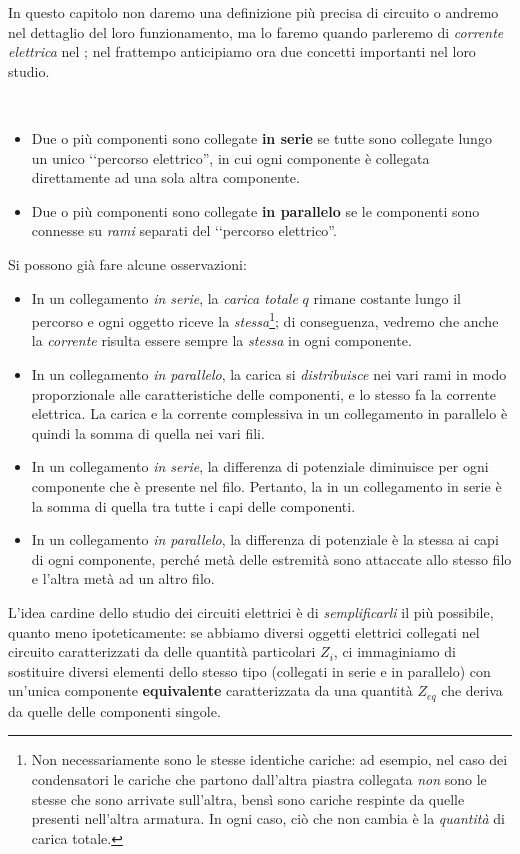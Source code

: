In questo capitolo non daremo una definizione più precisa di circuito o andremo nel dettaglio del loro funzionamento, ma lo faremo quando parleremo di \textit{corrente elettrica} nel ; nel frattempo anticipiamo ora due concetti importanti nel loro studio.
\begin{defines}~
	\begin{itemize}
		\item Due o più componenti sono collegate \textbf{in serie} se tutte sono collegate lungo un unico ‘‘percorso elettrico'', in cui ogni componente è collegata direttamente ad una sola altra componente.
		\item Due o più componenti sono collegate \textbf{in parallelo} se le componenti sono connesse su \textit{rami} separati del ‘‘percorso elettrico''.
	\end{itemize}
\end{defines}
Si possono già fare alcune osservazioni:
\begin{itemize}
	\item In un collegamento \textit{in serie}, la \textit{carica totale} $q$ rimane costante lungo il percorso e ogni oggetto riceve la \textit{stessa}\footnote{Non necessariamente sono le stesse identiche cariche: ad esempio, nel caso dei condensatori le cariche che partono dall'altra piastra collegata \textit{non} sono le stesse che sono arrivate sull'altra, bensì sono cariche respinte da quelle presenti nell'altra armatura. In ogni caso, ciò che non cambia è la \textit{quantità} di carica totale.}; di conseguenza, vedremo che anche la \textit{corrente} risulta essere sempre la \textit{stessa} in ogni componente.
	\item In un collegamento \textit{in parallelo}, la carica si \textit{distribuisce} nei vari rami in modo proporzionale alle caratteristiche delle componenti, e lo stesso fa la corrente elettrica. La carica e la corrente complessiva in un collegamento in parallelo è quindi la somma di quella nei vari fili.
	\item In un collegamento \textit{in serie}, la differenza di potenziale diminuisce per ogni componente che è presente nel filo. Pertanto, la \ddp in un collegamento in serie è la somma di quella tra tutte i capi delle componenti.
	\item In un collegamento \textit{in parallelo}, la differenza di potenziale è la stessa ai capi di ogni componente, perché metà delle estremità sono attaccate allo stesso filo e l'altra metà ad un altro filo.
\end{itemize}
L'idea cardine dello studio dei circuiti elettrici è di \textit{semplificarli} il più possibile, quanto meno ipoteticamente: se abbiamo diversi oggetti elettrici collegati nel circuito caratterizzati da delle quantità particolari $Z_i$, ci immaginiamo di sostituire diversi elementi dello stesso tipo (collegati in serie e in parallelo) con un'unica componente \textbf{equivalente} caratterizzata da una quantità $Z_{eq}$ che deriva da quelle delle componenti singole.
